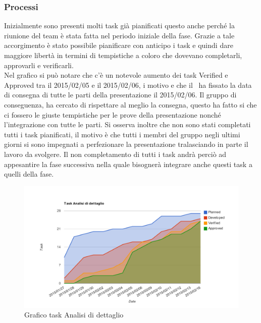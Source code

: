 		\subsubsection{Processi}
		Inizialmente sono presenti molti task già pianificati questo anche perché la  riunione del team è stata fatta nel periodo iniziale della fase. Grazie a tale accorgimento è stato possibile pianificare con anticipo i task e quindi dare maggiore libertà in termini di tempistiche a coloro che dovevano completarli,  approvarli e verificarli.  \\
		Nel grafico si può notare che c'è un notevole aumento dei task Verified e Approved tra il 2015/02/05 e il 2015/02/06, i motivo e che il \roleProjectManager \ ha fissato la data di consegna di tutte le parti della presentazione il 2015/02/06. Il gruppo di conseguenza, ha cercato di rispettare al meglio la consegna, questo ha fatto si che ci fossero le giuste tempistiche per le prove della presentazione nonché l'integrazione con tutte le parti. Si osserva inoltre che non sono stati completati tutti i task pianificati, il motivo è che tutti i membri del gruppo negli ultimi giorni si sono impegnati a perfezionare la presentazione tralasciando in parte il lavoro da svolgere. Il non completamento di tutti i task andrà perciò ad appesantire la fase successiva nella quale bisognerà integrare anche questi task a quelli della fase.
		\begin{figure}[htbp]
				\centering
				\centerline{\includegraphics[scale=1]{images/Grafico_fase_3.pdf}}
				\caption{Grafico task Analisi di dettaglio}
				\label{fig:taskfase3}
			\end{figure}	
				
